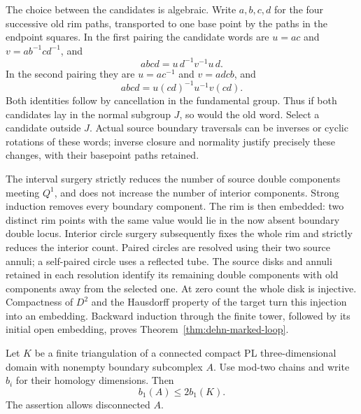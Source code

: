 The choice between the candidates is algebraic.  Write $a,b,c,d$ for
the four successive old rim paths, transported to one base point by
the paths in the endpoint squares.  In the first pairing the candidate
words are $u=ac$ and $v=ab^{-1}cd^{-1}$, and
\[
             abcd=u\,d^{-1}v^{-1}u\,d.
\]
In the second pairing they are $u=ac^{-1}$ and $v=adcb$, and
\[
             abcd=u(cd)^{-1}u^{-1}v(cd).
\]
Both identities follow by cancellation in the fundamental group.
Thus if both candidates lay in the normal subgroup $J$, so would the
old word.  Select a candidate outside $J$.  Actual source boundary
traversals can be inverses or cyclic rotations of these words; inverse
closure and normality justify precisely these changes, with their
basepoint paths retained.

The interval surgery strictly reduces the number of source double
components meeting $Q^1$, and does not increase the number of interior
components.  Strong induction removes every boundary component.  The
rim is then embedded: two distinct rim points with the same value
would lie in the now absent boundary double locus.  Interior circle
surgery subsequently fixes the whole rim and strictly reduces the
interior count.  Paired circles are resolved using their two source
annuli; a self-paired circle uses a reflected tube.  The source disks
and annuli retained in each resolution identify its remaining double
components with old components away from the selected one.  At zero
count the whole disk is injective.  Compactness of $D^2$ and the
Hausdorff property of the target turn this injection into an embedding.
Backward induction through the finite tower, followed by its initial
open embedding, proves Theorem~\ref{thm:dehn-marked-loop}.

\begin{lemma}
\label{lem:dehn-boundary-rank}
Let $K$ be a finite triangulation of a connected compact PL
three-dimensional domain with nonempty boundary subcomplex $A$.
Use mod-two chains and write $b_i$ for their homology dimensions.
Then
\[
                         b_1(A)\leq2b_1(K).
\]
The assertion allows disconnected $A$.
\end{lemma}

